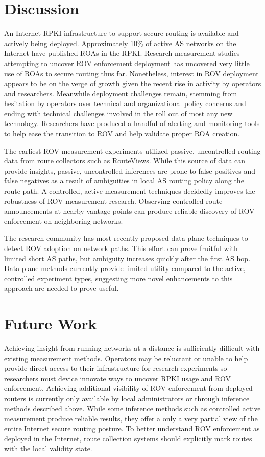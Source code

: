 \documentclass[sigconf]{acmart}
\begin{document}
\section{Discussion}\label{sec:Discussion}

An Internet RPKI infrastructure to support secure routing is available
and actively being deployed.  Approximately 10\% of active AS networks
on the Internet have published ROAs in the RPKI.   Research measurement
studies attempting to uncover ROV enforcement deployment has uncovered
very little use of ROAs to secure routing thus far.  Nonetheless,
interest in ROV deployment appears to be on the verge of growth given
the recent rise in activity by operators and researchers.  Meanwhile
deployment challenges remain, stemming from hesitation by operators over
technical and organizational policy concerns and ending with technical
challenges involved in the roll out of most any new technology.
Researchers have produced a handful of alerting and monitoring tools to
help ease the transition to ROV and help validate proper ROA creation.

The earliest ROV measurement experiments utilized passive, uncontrolled
routing data from route collectors such as RouteViews.  While this
source of data can provide insights, passive, uncontrolled inferences
are prone to false positives and false negatives as a result of
ambiguities in local AS routing policy along the route path.  A
controlled, active measurement techniques decidedly improves the
robustness of ROV measurement research.  Observing controlled route
announcements at nearby vantage points can produce reliable discovery of
ROV enforcement on neighboring networks.

The research community has most recently proposed data plane techniques
to detect ROV adoption on network paths.  This effort can prove fruitful
with limited short AS paths, but ambiguity increases quickly after
the first AS hop.  Data plane methods currently provide limited utility
compared to the active, controlled experiment types, suggesting more
novel enhancements to this approach are needed to prove useful.

\section{Future Work}\label{sec:Future Work}

Achieving insight from running networks at a distance is sufficiently
difficult with existing measurement methods.  Operators may be reluctant
or unable to help provide direct access to their infrastructure for
research experiments so researchers must device innovate ways to uncover
RPKI usage and ROV enforcement.  Achieving additional visibility of ROV
enforcement from deployed routers is currently only available by local
administrators or through inference methods described above.  While some
inference methods such as controlled active measurement produce reliable
results, they offer a only a very partial view of the entire Internet
secure routing posture.  To better understand ROV enforcement as
deployed in the Internet, route collection systems should explicitly
mark routes with the local validity state.
\end{document}
